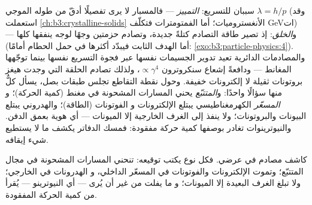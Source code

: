 \begin{remark}\label{rem:b3:particle-physics:machines}
سببان للتسريع: \emph{التمييز} --- فالمسبار لا يرى
تفصيلًا أدقّ من طوله الموجي $\lambda = h/p$
(وقد استعملت \cref{ch:b3:crystalline-solids} الأنغستروميات؛ أما الفمتومترات
فتكلّف \unit{GeV}ات) --- و\emph{الخلق}: إذ تصير طاقة التصادم
كتلةً جديدة، وتصادم حزمتين وجهًا لوجه ينفقها كلها
(أما الهدف الثابت فيبدّد أكثرها في حمل الحطام أمامًا:
\cref{exo:b3:particle-physics:4}). والمصادمات الدائرية تعيد تدوير
الجسيمات نفسها عبر فجوة التسريع نفسها بينما
توجّهها المغانط --- ودافعةً إشعاع سنكروترون
$\propto\gamma^4$، ولذلك تصادم الحلقة التي وجدت هيغز
بروتونات ثقيلة لا إلكترونات خفيفة. وحول
نقطة التقاطع تجلس طبقات بصل، يسأل كلٌّ منها سؤالًا واحدًا:
و\emph{المتتبّع} يحني المسارات المشحونة في مغنط (كمية الحركة)؛ و
\emph{المسعّر} الكهرمغناطيسي يبتلع الإلكترونات و
الفوتونات (الطاقة)؛ والهدروني يبتلع البيونات والبروتونات؛
ولا ينفذ إلى الغرف الخارجية إلا الميونات ---
أي هوية بعمق الدفن. والنيوترينوات تغادر بوصفها كمية حركة مفقودة:
فمسك الدفاتر يكشف ما لا يستطيع شيء إيقافه.
\end{remark}

\begin{omfigure}

{\small كاشف مصادم في  عرضي. فكل نوع
يكتب توقيعه: تنحني المسارات المشحونة في مجال
المتتبّع؛ وتموت الإلكترونات والفوتونات في المسعّر الداخلي، و
الهدرونات في الخارجي؛ ولا تبلغ الغرف البعيدة إلا الميونات؛ و
ما يفلت من غير أن يُرى --- أي النيوترينو --- يُقرأ من كمية الحركة
المفقودة.}
\end{omfigure}

